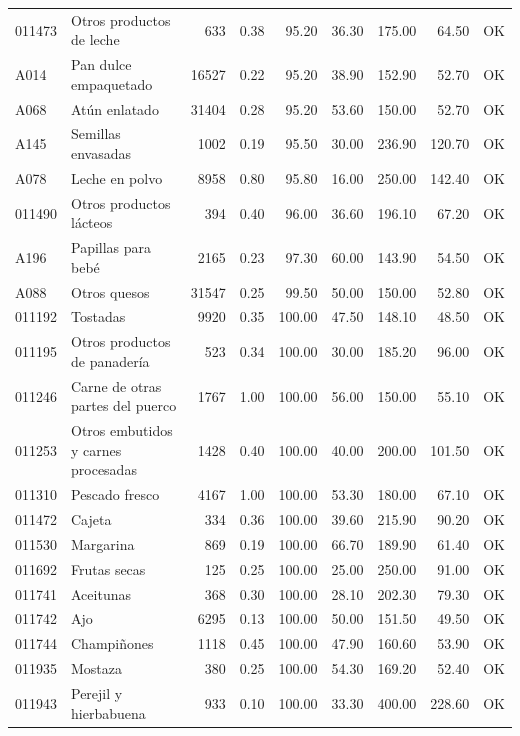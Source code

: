 \begin{table}[ht]
\begin{tabular}{llrrrrrrl}
  011473 & Otros productos de leche & 633 & 0.38 & 95.20 & 36.30 & 175.00 & 64.50 & OK \\ 
  A014 & Pan dulce empaquetado & 16527 & 0.22 & 95.20 & 38.90 & 152.90 & 52.70 & OK \\ 
  A068 & Atún enlatado & 31404 & 0.28 & 95.20 & 53.60 & 150.00 & 52.70 & OK \\ 
  A145 & Semillas envasadas & 1002 & 0.19 & 95.50 & 30.00 & 236.90 & 120.70 & OK \\ 
  A078 & Leche en polvo & 8958 & 0.80 & 95.80 & 16.00 & 250.00 & 142.40 & OK \\ 
  011490 & Otros productos lácteos & 394 & 0.40 & 96.00 & 36.60 & 196.10 & 67.20 & OK \\ 
  A196 & Papillas para bebé & 2165 & 0.23 & 97.30 & 60.00 & 143.90 & 54.50 & OK \\ 
  A088 & Otros quesos & 31547 & 0.25 & 99.50 & 50.00 & 150.00 & 52.80 & OK \\ 
  011192 & Tostadas & 9920 & 0.35 & 100.00 & 47.50 & 148.10 & 48.50 & OK \\ 
  011195 & Otros productos de panadería & 523 & 0.34 & 100.00 & 30.00 & 185.20 & 96.00 & OK \\ 
  011246 & Carne de otras partes del puerco & 1767 & 1.00 & 100.00 & 56.00 & 150.00 & 55.10 & OK \\ 
  011253 & Otros embutidos y carnes procesadas & 1428 & 0.40 & 100.00 & 40.00 & 200.00 & 101.50 & OK \\ 
  011310 & Pescado fresco & 4167 & 1.00 & 100.00 & 53.30 & 180.00 & 67.10 & OK \\ 
  011472 & Cajeta & 334 & 0.36 & 100.00 & 39.60 & 215.90 & 90.20 & OK \\ 
  011530 & Margarina & 869 & 0.19 & 100.00 & 66.70 & 189.90 & 61.40 & OK \\ 
  011692 & Frutas secas & 125 & 0.25 & 100.00 & 25.00 & 250.00 & 91.00 & OK \\ 
  011741 & Aceitunas & 368 & 0.30 & 100.00 & 28.10 & 202.30 & 79.30 & OK \\ 
  011742 & Ajo & 6295 & 0.13 & 100.00 & 50.00 & 151.50 & 49.50 & OK \\ 
  011744 & Champiñones & 1118 & 0.45 & 100.00 & 47.90 & 160.60 & 53.90 & OK \\ 
  011935 & Mostaza & 380 & 0.25 & 100.00 & 54.30 & 169.20 & 52.40 & OK \\ 
  011943 & Perejil y hierbabuena & 933 & 0.10 & 100.00 & 33.30 & 400.00 & 228.60 & OK \\ 

\end{tabular}
\end{table}
